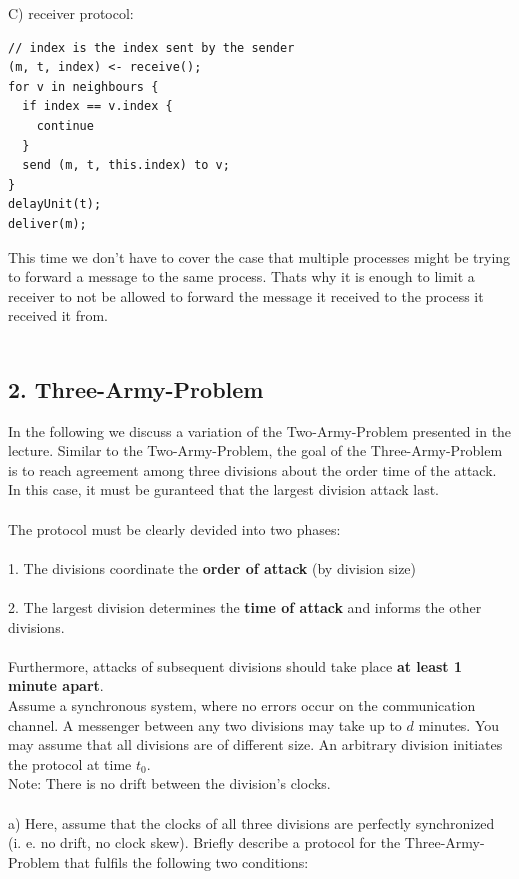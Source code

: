 \documentclass{article}
\begin{document}
C) receiver protocol:
\begin{lstlisting}[style=CStyle]
// index is the index sent by the sender
(m, t, index) <- receive();
for v in neighbours {
  if index == v.index {
    continue
  }
  send (m, t, this.index) to v;
}
delayUnit(t);
deliver(m);
\end{lstlisting}
This time we don't have to cover the case that multiple processes might be trying to forward a message to
the same process. Thats why it is enough to limit a receiver to not be allowed to forward the message it 
received to the process it received it from.\\
\\
\subsection*{2. Three-Army-Problem}
In the following we discuss a variation of the Two-Army-Problem presented in the lecture. Similar to the
Two-Army-Problem, the goal of the Three-Army-Problem is to reach agreement among three divisions about
the order time of the attack. In this case, it must be guranteed that the largest division attack last.\\
\\
The protocol must be clearly devided into two phases:\\
\\
1. The divisions coordinate the \textbf{order of attack} (by division size)\\
\\
2. The largest division determines the \textbf{time of attack} and informs the other divisions.\\
\\
Furthermore, attacks of subsequent divisions should take place \textbf{at least 1 minute apart}.\\
Assume a synchronous system, where no errors occur on the communication channel. A messenger between any
two divisions may take up to $d$ minutes. You may assume that all divisions are of different size. An
arbitrary division initiates the protocol at time $t_0$.\\
Note: There is no drift between the division's clocks.\\
\\
a) Here, assume that the clocks of all three divisions are perfectly synchronized (i. e. no drift, no
clock skew). Briefly describe a protocol for the Three-Army-Problem that fulfils the following two
conditions:\\
\end{document}

